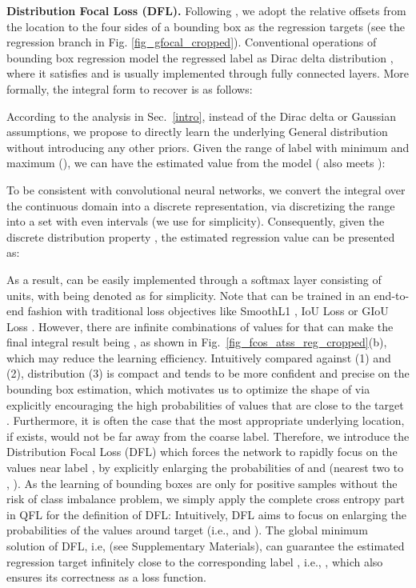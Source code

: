 \documentclass{article}
\begin{document}
\textbf{Distribution Focal Loss (DFL).} Following \cite{tian2019fcos,zhang2019bridging}, we adopt the relative offsets from  the location to the four sides of a bounding box as the regression targets (see the regression branch in Fig. \ref{fig_gfocal_cropped}). Conventional operations of bounding box regression model the regressed label  as Dirac delta distribution , where it satisfies  and is usually implemented through fully connected layers. More formally, the integral form to recover  is as follows:

According to the analysis in Sec.~\ref{intro}, instead of the Dirac delta \cite{ren2015faster,he2017mask,cai2018cascade,tian2019fcos,zhang2019bridging} or Gaussian \cite{choi2019gaussian,he2019bounding} assumptions, we propose to directly learn the underlying General distribution  without introducing any other priors. Given the range of label  with minimum  and maximum  (), we can have the estimated value  from the model ( also meets ):

To be consistent with convolutional neural networks, we convert the integral over the continuous domain into a discrete representation, via discretizing the range  into a set  with even intervals  (we use  for simplicity). Consequently, given the discrete distribution property , the estimated regression value  can be presented as:

As a result,  can be easily implemented through a softmax  layer consisting of  units, with  being denoted as  for simplicity. Note that  can be trained in an end-to-end fashion with traditional loss objectives like SmoothL1 \cite{girshick2015fast}, IoU Loss \cite{tychsen2018improving} or GIoU Loss \cite{rezatofighi2019generalized}. However, there are infinite combinations of values for  that can make the final integral result being , as shown in Fig.~\ref{fig_fcos_atss_reg_cropped}(b), which may reduce the learning efficiency. Intuitively compared against (1) and (2), distribution (3) is compact and tends to be more confident and precise on the bounding box estimation, which motivates us to optimize the shape of  via explicitly encouraging the high probabilities of values that are close to the target . Furthermore, it is often the case that the most appropriate underlying location, if exists, would not be far away from the 
coarse label. Therefore, we introduce the Distribution Focal Loss (DFL) which forces the network to rapidly focus on the values near label , by explicitly enlarging the probabilities of  and  (nearest two to , ). As the learning of bounding boxes are only for positive samples without the risk of class imbalance problem, we simply apply the complete cross entropy part in QFL for the definition of DFL:
Intuitively, DFL aims to focus on enlarging the probabilities of the values around target  (i.e.,  and ). The global minimum solution of DFL, i.e,  (see Supplementary Materials), can guarantee the estimated regression target  infinitely close to the corresponding label , i.e., , which also ensures its correctness as a loss function.
\end{document}
